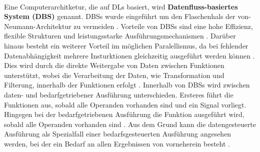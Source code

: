 \documentclass{article}
\begin{document}
    \\
    Eine Computerarchitketur, die auf DLs basiert, wird \textbf{Datenfluss-basiertes System (DBS)} genannt.
    DBSs wurde eingeführt um den Flaschenhals der von-Neumann-Architektur zu vermeiden \cite{1}.
    Vorteile von DBSs sind eine hohe Effizienz, flexible Strukturen und leistungsstarke Ausführungsmechanismen \cite{1}.
    Darüber hinaus besteht ein weiterer Vorteil im möglichen Paralellismus, da bei fehlender Datenabhängigkeit mehrere Insturktionen gleichzeitig ausgeführt werden können \cite{1}.
    Dies wird durch die direkte Weitergabe von Daten zwischen Funktionen unterstützt, wobei die Verarbeitung der Daten, wie Transformation und Filterung, innerhalb der Funktionen erfolgt \cite{15}.
    Innerhalb von DBSs wird zwischen daten- und bedarfgetriebener Ausführung unterschieden. 
    Ersteres führt die Funktionen aus, sobald alle Operanden vorhanden sind und ein Signal vorliegt. 
    Hingegen bei der bedarfgetriebenen Ausführung die Funktion ausgeführt wird, sobald alle Operanden vorhanden sind \cite{2}.
    Aus dem Grund kann die datengesteuerte Ausführung als Spezialfall einer bedarfsgesteuerten Ausführung angesehen werden, bei der ein Bedarf an allen Ergebnissen von vorneherein besteht \cite{11}.
\end{document}
